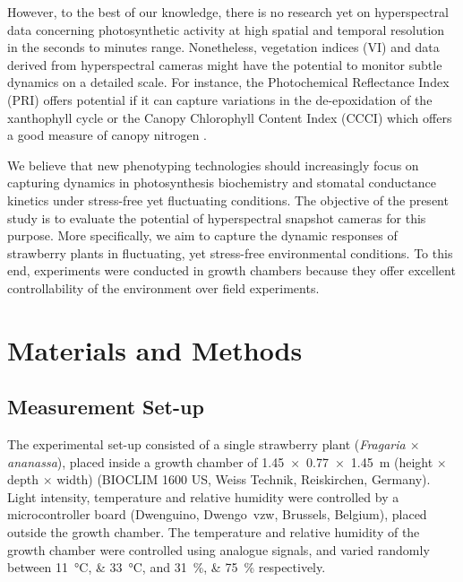 \documentclass[10pt,authoryear,a4paper]{elsarticle}
\begin{document}
    However, to the best of our knowledge, there is no research yet on hyperspectral data concerning photosynthetic activity at high spatial and temporal resolution in the seconds to minutes range. Nonetheless, vegetation indices (VI) and data derived from hyperspectral cameras might have the potential to monitor subtle dynamics on a detailed scale. For instance, the Photochemical Reflectance Index (PRI) offers potential if it can capture variations in the de-epoxidation of the xanthophyll cycle \citep{alonsoDiurnal2017} or the Canopy Chlorophyll Content Index (CCCI) which offers a good measure of canopy nitrogen \citep{barnesCoincident2000}. 
    
    We believe that new phenotyping technologies should increasingly focus on capturing dynamics in photosynthesis biochemistry and stomatal conductance kinetics under stress-free yet fluctuating conditions. The objective of the present study is to evaluate the potential of hyperspectral snapshot cameras for this purpose. More specifically, we aim to capture the dynamic responses of strawberry plants in fluctuating, yet stress-free environmental conditions. To this end, experiments were conducted in growth chambers because they offer excellent controllability of the environment over field experiments.

\section{Materials and Methods}
    
    \subsection{Measurement Set-up}
    
        The experimental set-up consisted of a single strawberry plant (\textit{Fragaria $\times$ ananassa}), placed inside a growth chamber of \SI[product-units = single]{1.45 x 0.77 x 1.45}{\metre} (height $\times$ depth $\times$ width) (BIOCLIM 1600 US, Weiss Technik, Reiskirchen, Germany). Light intensity, temperature and relative humidity were controlled by a microcontroller board (Dwenguino, Dwengo~vzw, Brussels, Belgium), placed outside the growth chamber. The temperature and relative humidity of the growth chamber were controlled using analogue signals, and varied randomly between \SIlist{11;33}{\celsius}, and  \SIlist{31;75}{\percent} respectively.
        
\end{document}
